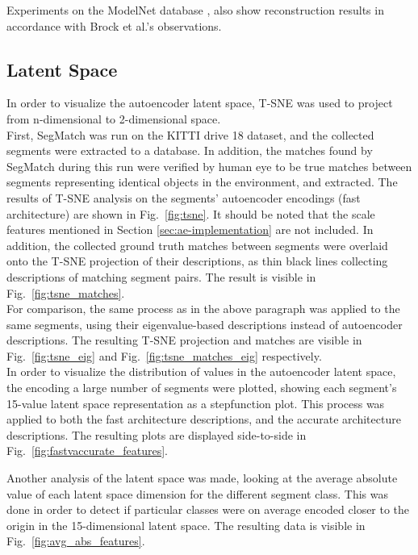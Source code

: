 Experiments on the ModelNet database \cite{modelnet}, also show reconstruction results in accordance with Brock et al.'s observations.


\subsection{Latent Space}
\label{subsec:latent_space}

In order to visualize the autoencoder latent space, T-SNE was used to project from n-dimensional to 2-dimensional space.\\

First, SegMatch was run on the KITTI drive 18 dataset, and the collected segments were extracted to a database. In addition, the matches found by SegMatch during this run were verified by human eye to be true matches between segments representing identical objects in the environment, and extracted. The results of T-SNE analysis on the segments' autoencoder encodings (fast architecture) are shown in Fig.~\ref{fig:tsne}. It should be noted that the scale features mentioned in Section \ref{sec:ae-implementation} are not included. In addition, the collected ground truth matches between segments were overlaid onto the T-SNE projection of their descriptions, as thin black lines collecting descriptions of matching segment pairs. The result is visible in Fig.~\ref{fig:tsne_matches}.\\

For comparison, the same process as in the above paragraph was applied to the same segments, using their eigenvalue-based descriptions instead of autoencoder descriptions. The resulting T-SNE projection and matches are visible in Fig.~\ref{fig:tsne_eig} and Fig.~\ref{fig:tsne_matches_eig} respectively.\\

In order to visualize the distribution of values in the autoencoder latent space, the encoding a large number of segments were plotted, showing each segment's 15-value latent space representation as a stepfunction plot. This process was applied to both the fast architecture descriptions, and the accurate architecture descriptions. The resulting plots are displayed side-to-side in Fig.~\ref{fig:fastvaccurate_features}.

Another analysis of the latent space was made, looking at the average absolute value of each latent space dimension for the different segment class. This was done in order to detect if particular classes were on average encoded closer to the origin in the 15-dimensional latent space. The resulting data is visible in Fig.~\ref{fig:avg_abs_features}.\\


